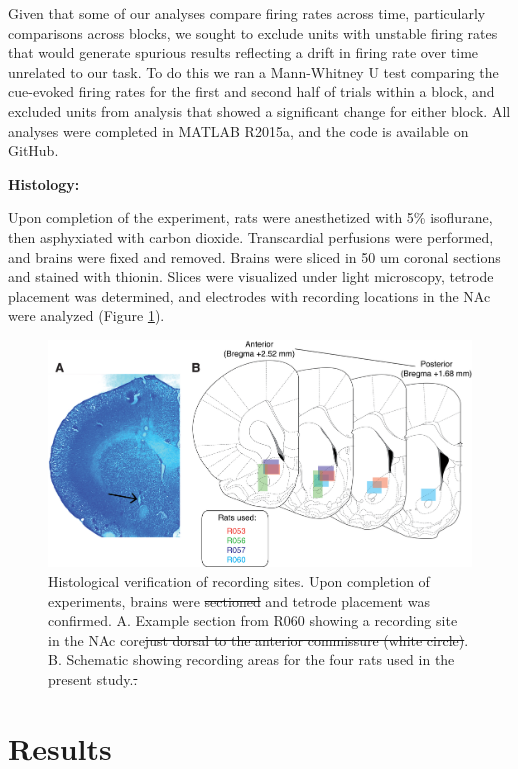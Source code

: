 \documentclass[11pt]{article}
\providecommand{\DIFadd}[1]{{\protect\color{blue}\uwave{#1}}} %
\providecommand{\DIFdel}[1]{{\protect\color{red}\sout{#1}}}                      %
\providecommand{\DIFaddFL}[1]{\DIFadd{#1}} %
\providecommand{\DIFdelFL}[1]{\DIFdel{#1}} %
\providecommand{\DIFaddbeginFL}{} %
\providecommand{\DIFaddendFL}{} %
\providecommand{\DIFdelbeginFL}{} %
\providecommand{\DIFdelendFL}{} %
\newcommand{\DIFscaledelfig}{0.5}
\newlength{\DIFdelgraphicswidth} %
\newlength{\DIFdelgraphicsheight} %
\newcommand{\DIFaddincludegraphics}[2][]{{\color{blue}\fbox{\DIFOincludegraphics[#1]{#2}}}} %
\newcommand{\DIFdelincludegraphics}[2][]{%
\sbox{\DIFdelgraphicsbox}{\DIFOincludegraphics[#1]{#2}}%
\settoboxwidth{\DIFdelgraphicswidth}{\DIFdelgraphicsbox} %
\settoboxtotalheight{\DIFdelgraphicsheight}{\DIFdelgraphicsbox} %
\scalebox{\DIFscaledelfig}{%
\parbox[b]{\DIFdelgraphicswidth}{\usebox{\DIFdelgraphicsbox}\\[-\baselineskip] \rule{\DIFdelgraphicswidth}{0em}}\llap{\resizebox{\DIFdelgraphicswidth}{\DIFdelgraphicsheight}{%
\setlength{\unitlength}{\DIFdelgraphicswidth}%
\begin{picture}(1,1)%
\thicklines\linethickness{2pt} %
{\color[rgb]{1,0,0}\put(0,0){\framebox(1,1){}}}%
{\color[rgb]{1,0,0}\put(0,0){\line( 1,1){1}}}%
{\color[rgb]{1,0,0}\put(0,1){\line(1,-1){1}}}%
\end{picture}%
}\hspace*{3pt}}} %
} %
\DeclareRobustCommand{\DIFaddbeginFL}{\DIFOaddbeginFL \let\includegraphics\DIFaddincludegraphics} %
\DeclareRobustCommand{\DIFaddendFL}{\DIFOaddendFL \let\includegraphics\DIFOincludegraphics} %
\DeclareRobustCommand{\DIFdelbeginFL}{\DIFOdelbeginFL \let\includegraphics\DIFdelincludegraphics} %
\DeclareRobustCommand{\DIFdelendFL}{\DIFOaddendFL \let\includegraphics\DIFOincludegraphics} %
\begin{document}
Given that some of our analyses compare firing rates across time, particularly comparisons across blocks, we sought to exclude units with unstable firing rates that would generate spurious results reflecting a drift in firing rate over time unrelated to our task. To do this we ran a Mann-Whitney U test comparing the cue-evoked firing rates for the first and second half of trials within a block, and excluded units from analysis that showed a significant change for either block.  All analyses were completed in MATLAB R2015a, and the code is available on GitHub.


{\bf Histology:}

Upon completion of the experiment, rats were anesthetized with 5\% isoflurane, then asphyxiated with carbon dioxide. Transcardial perfusions were performed, and brains were fixed and removed. Brains were sliced in 50 um coronal sections and stained with thionin. Slices were visualized under light microscopy, tetrode placement was determined, and electrodes with recording locations in the NAc were analyzed (Figure \ref{fig:histo}).

\begin{figure}
[h]
\centering
\includegraphics[width=\textwidth]{Fig 3 - Histology.png}
\caption{Histological verification of recording sites. Upon completion of experiments, brains were \DIFdelbeginFL \DIFdelFL{sectioned }\DIFdelendFL \DIFaddbeginFL \DIFaddFL{sliced }\DIFaddendFL and tetrode placement was confirmed. A. Example section from R060 showing a recording site in the NAc core\DIFdelbeginFL \DIFdelFL{just dorsal to the anterior commissure (white circle)}\DIFdelendFL . B. Schematic showing recording areas for the four rats used in the present study.\DIFdelbeginFL \DIFdelFL{.}\DIFdelendFL }
\label{fig:histo}

\end{figure}
\section*{Results}
\end{document}
